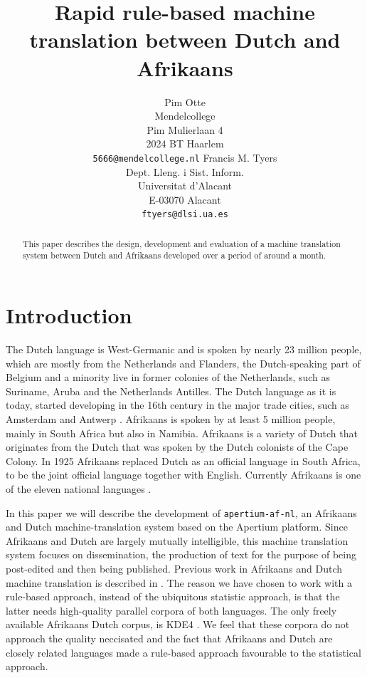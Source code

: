 \documentclass[11pt]{article}
\title{Rapid rule-based machine translation between Dutch and Afrikaans}
\author{Pim Otte\\
  Mendelcollege\\
  Pim Mulierlaan 4\\
  2024 BT Haarlem\\
  {\tt 5666@mendelcollege.nl}  \And
  Francis M. Tyers\\
  Dept. Lleng. i Sist. Inform.\\
  Universitat d'Alacant\\
  E-03070 Alacant \\
  {\tt ftyers@dlsi.ua.es}}
\date{}
\begin{document}
\maketitle
\begin{abstract}
 This paper describes the design, development and evaluation of a machine
 translation system between Dutch and Afrikaans developed over a period of
 around a month.
\end{abstract}

\section{Introduction}

The Dutch language is West-Germanic and is spoken by nearly 23 million people, which are 
mostly from the Netherlands and Flanders, the Dutch-speaking part of Belgium and a minority 
live in former colonies of the Netherlands, such as Suriname, Aruba and the Netherlands 
Antilles. The Dutch language as it is today, started developing in the 16th century in the 
major trade cities, such as Amsterdam and Antwerp \cite{Shetter:02}.  Afrikaans is spoken 
by at least 5 million people, mainly in South Africa but also in Namibia. Afrikaans is a 
variety of Dutch that originates from the Dutch that was spoken by the Dutch colonists of 
the Cape Colony. In 1925 Afrikaans replaced Dutch as an official language in South Africa, to 
be the joint official language together with English. Currently Afrikaans is one of the 
eleven national languages \cite{Donaldson:93}.

In this paper we will describe the development of {\small {\tt apertium-af-nl}}, an Afrikaans 
and Dutch machine-translation system based on the Apertium platform. Since Afrikaans and Dutch 
are largely mutually intelligible, this machine translation system focuses on dissemination, the 
production of text for the purpose of being post-edited and then being published. Previous 
work in Afrikaans and Dutch machine translation is described in \cite{Huyssteen:09}. The reason
we have chosen to work with a rule-based approach, instead of the ubiquitous statistic approach,
is that the latter needs high-quality parallel corpora of both languages. The only freely available
Afrikaans Dutch corpus, is KDE4 . We feel
that these corpora do not approach the quality neccisated and the fact that Afrikaans and Dutch
are closely related languages made a rule-based approach favourable to the statistical approach.
\end{document}
